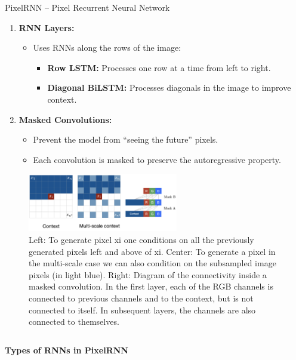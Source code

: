 \begin{frame}[allowframebreaks]{PixelRNN – Pixel Recurrent Neural Network}
\begin{enumerate}
        \item \textbf{RNN Layers:}
        \begin{itemize}
            \item Uses RNNs along the rows of the image:
            \begin{itemize}
                \item \textbf{Row LSTM:} Processes one row at a time from left to right.
                \item \textbf{Diagonal BiLSTM:} Processes diagonals in the image to improve context.
            \end{itemize}
        \end{itemize}

        \item \textbf{Masked Convolutions:}
        \begin{itemize}
            \item Prevent the model from “seeing the future” pixels.
            \item Each convolution is masked to preserve the autoregressive property.
        \end{itemize}
    \end{enumerate}

    \framebreak
    \begin{figure}
        \centering
        \includegraphics[height=1.0in]{images/autoregressive/pixel-rnn.png}
        \caption*{Left: To generate pixel xi one conditions on all the previously generated pixels left and above of xi. Center: To generate a pixel in the multi-scale case we can also condition on the
subsampled image pixels (in light blue). Right: Diagram of the
connectivity inside a masked convolution. In the first layer, each
of the RGB channels is connected to previous channels and to the
context, but is not connected to itself. In subsequent layers, the
channels are also connected to themselves.}
    \end{figure}

    \framebreak

    \begin{columns}
        \begin{column}{0.4\textwidth}
            \textbf{Types of RNNs in PixelRNN}


\end{column}
\end{columns}
\end{frame}
